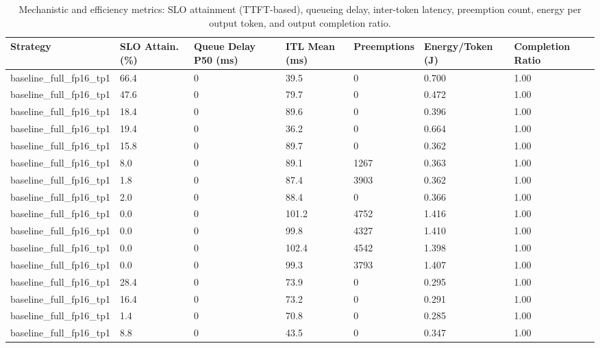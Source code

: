 \begin{table}
\caption{Mechanistic and efficiency metrics: SLO attainment (TTFT-based), queueing delay, inter-token latency, preemption count, energy per output token, and output completion ratio.}
\label{tab:efficiency}
\begin{tabular}{lllllll}
\toprule
Strategy & SLO Attain. (\%) & Queue Delay P50 (ms) & ITL Mean (ms) & Preemptions & Energy/Token (J) & Completion Ratio \\
\midrule
baseline\_full\_fp16\_tp1 & 66.4 & 0 & 39.5 & 0 & 0.700 & 1.00 \\
baseline\_full\_fp16\_tp1 & 47.6 & 0 & 79.7 & 0 & 0.472 & 1.00 \\
baseline\_full\_fp16\_tp1 & 18.4 & 0 & 89.6 & 0 & 0.396 & 1.00 \\
baseline\_full\_fp16\_tp1 & 19.4 & 0 & 36.2 & 0 & 0.664 & 1.00 \\
baseline\_full\_fp16\_tp1 & 15.8 & 0 & 89.7 & 0 & 0.362 & 1.00 \\
baseline\_full\_fp16\_tp1 & 8.0 & 0 & 89.1 & 1267 & 0.363 & 1.00 \\
baseline\_full\_fp16\_tp1 & 1.8 & 0 & 87.4 & 3903 & 0.362 & 1.00 \\
baseline\_full\_fp16\_tp1 & 2.0 & 0 & 88.4 & 0 & 0.366 & 1.00 \\
baseline\_full\_fp16\_tp1 & 0.0 & 0 & 101.2 & 4752 & 1.416 & 1.00 \\
baseline\_full\_fp16\_tp1 & 0.0 & 0 & 99.8 & 4327 & 1.410 & 1.00 \\
baseline\_full\_fp16\_tp1 & 0.0 & 0 & 102.4 & 4542 & 1.398 & 1.00 \\
baseline\_full\_fp16\_tp1 & 0.0 & 0 & 99.3 & 3793 & 1.407 & 1.00 \\
baseline\_full\_fp16\_tp1 & 28.4 & 0 & 73.9 & 0 & 0.295 & 1.00 \\
baseline\_full\_fp16\_tp1 & 16.4 & 0 & 73.2 & 0 & 0.291 & 1.00 \\
baseline\_full\_fp16\_tp1 & 1.4 & 0 & 70.8 & 0 & 0.285 & 1.00 \\
baseline\_full\_fp16\_tp1 & 8.8 & 0 & 43.5 & 0 & 0.347 & 1.00 \\
\bottomrule
\end{tabular}
\end{table}

